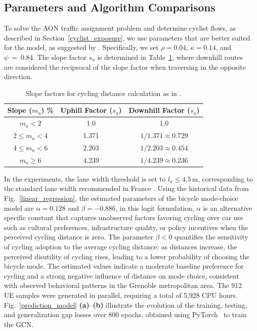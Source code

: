 \documentclass[lettersize,journal]{IEEEtran}
\begin{document}
 \subsection{Parameters and Algorithm Comparisons}
To solve the AON traffic assignment problem and determine cyclist flows, as described in Section~\ref{cyclist_exposure}, we use parameters that are better suited for the model, as suggested by \cite{cooper2017using}. Specifically, we set $\rho = 0.04$, $\kappa = 0.14$, and $\psi~=~0.84$. The slope factor $s_{a}$ is determined in Table~\ref{table:slope_factors}, where downhill routes are considered the reciprocal of the slope factor when traversing in the opposite direction.
\begin{table}[h!]
\centering
\begin{tabular}{c|c|c}
\hline
Slope ($m_a$) \% & Uphill Factor ($s_a$) & Downhill Factor ($s_a$) \\ \hline
$m_a < 2$ & 1.0 & 1.0 \\ 
$2 \leq m_a < 4$ & 1.371 & $1/1.371 \approx 0.729$ \\ 
$4 \leq m_a < 6$ & 2.203 & $1/2.203 \approx 0.454$ \\ 
$m_a \geq 6$ & 4.239 & $1/4.239 \approx 0.236$ \\ \hline
\end{tabular}
\caption{\footnotesize Slope factors for cycling distance calculation as in \cite{jurado2025improving, cooper2017using}.}
\label{table:slope_factors}
\end{table}
In the experiments, the lane width threshold is set to $l_a \leq 4.5\,\mathrm{m}$, corresponding to the standard lane width recommended in France \cite{CEREMA2020}. Using the historical data from Fig.~\ref{linear_regression}, the estimated parameters of the bicycle mode-choice model are $\alpha = 0.128$ and $\beta = -0.886$, in this logit formulation, $\alpha$ is an alternative specific constant that captures unobserved factors favoring cycling over car use such as cultural preferences, infrastructure quality, or policy incentives when the perceived cycling distance is zero. 
The parameter $\beta < 0$ quantifies the sensitivity of cycling adoption to the average cycling distance: as distances increase, the perceived disutility of cycling rises, leading to a lower probability of choosing the bicycle mode. 
The estimated values indicate a moderate baseline preference for cycling and a strong negative influence of distance on mode choice, consistent with observed behavioral patterns in the Grenoble metropolitan area. The 912 UE samples were generated in parallel, requiring a total of 5,928 CPU hours. Fig.~\ref{prediction_model} \textbf{(a)}–\textbf{(b)} illustrate the evolution of the training, testing, and generalization gap losses over 800 epochs, obtained using PyTorch~\cite{NEURIPS2019_9015} to train the GCN.
\end{document}
